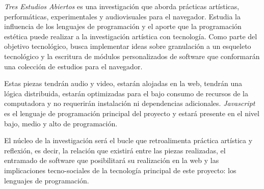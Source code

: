 
\textit{Tres Estudios Abiertos} es una investigación que aborda prácticas artísticas, performáticas, experimentales y audiovisuales para el navegador. Estudia la influencia de los lenguajes de programación y el aporte que la programación estética puede realizar a la investigación artística con tecnología. Como parte del objetivo tecnológico, busca implementar ideas sobre granulación a un esqueleto tecnológico y la escritura de módulos personalizados de software que conformarán una colección de estudios para el navegador. 


Estas piezas tendrán audio y video, estarán alojadas en la web, tendrán una lógica distribuida, estarán optimizadas para el bajo consumo de recursos de la computadora y no requerirán instalación ni dependencias adicionales. \textit{Javascript} es el lenguaje de programación principal del proyecto y estará presente en el nivel bajo, medio y alto de programación. %

El núcleo de la investigación será el bucle que retroalimenta práctica artística y reflexión, es decir, la relación que existirá entre las piezas realizadas, el entramado de software que posibilitará su realización en la web y las implicaciones tecno-sociales de la tecnología principal de este proyecto: los lenguajes de programación. 

